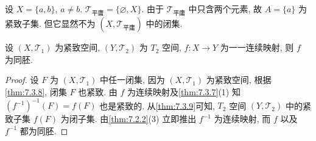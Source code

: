 \begin{example}\label{ex:7.3.3}
设 $X = \{a, b\}$, $a \neq b$. $\mathcal{T}_{\text{平庸}} = \{\varnothing, X\}$. 由于 $\mathcal{T}_{\text{平庸}}$ 中只含两个元素, 故 $A = \{a\}$ 为紧致子集. 但它显然不为 $(X, \mathcal{T}_{\text{平庸}})$ 中的闭集.
\end{example}

\begin{theorem}\label{thm:7.3.10}
设 $(X, \mathcal{T}_{1})$ 为紧致空间, $(Y, \mathcal{T}_{2})$ 为 $T_{2}$ 空间, $f\colon X \to Y$ 为一一连续映射, 则 $f$ 为同胚.
\end{theorem}

\begin{proof}
设 $F$ 为 $(X, \mathcal{T}_{1})$ 中任一闭集, 因为 $(X, \mathcal{T}_{1})$ 为紧致空间, 根据\cref{thm:7.3.8}, 闭集 $F$ 也紧致. 由 $f$ 为连续映射及\cref{thm:7.3.7}(1) 知 $(f^{-1})^{-1}(F) = f(F)$ 也是紧致的. 从\cref{thm:7.3.9}可知, $T_{2}$ 空间 $(Y, \mathcal{T}_{2})$ 中的紧致子集 $f(F)$ 为闭子集. 由\cref{thm:7.2.2}(3) 立即推出 $f^{-1}$ 为连续映射, 而 $f$ 以及 $f^{-1}$ 都为同胚.
\end{proof}

